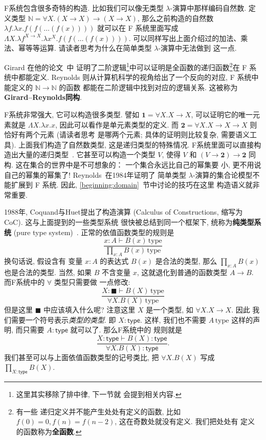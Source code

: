 \documentclass[UTF8]{ctexbook}
\newcommand{\cons}[1]{\textsf{#1}}
\theoremstyle{plain}
\theoremstyle{definition}
\theoremstyle{remark}
\begin{document}
F系统包含很多奇特的构造. 比如我们可以像无类型
\(\lambda\)-演算中那样编码自然数. 定义类型
\(\mathbb N = \forall X. (X \to X) \to (X \to X)\),
那么之前构造的自然数 \(\lambda f. \lambda x. f(f(\dots(f(x))))\)
就可以在 F 系统里面写成
\(\Lambda X. \lambda f^{X\to X}. \lambda x^X. f(f(\dots(f(x))))\).
可以同样写出上面介绍过的加法、乘法、幂等等运算.
请读者思考为什么在简单类型 \(\lambda\)-演算中无法做到
这一点.

Girard 在他的论文~\cite{girard:1972:systemf}中
证明了二阶逻辑\footnote{这里其实移除了排中律, 下一节就
会提到相关内容.}中可以证明是全函数的递归函数\footnote{有一些
递归定义并不能产生处处有定义的函数, 比如 \(f(0) = 0,
f(n) = f(n-2)\), 这在奇数处就没有定义. 我们把处处有
定义的函数称为\textbf{全函数}.}在 F 系统中都能定义.
Reynolds 则从计算机科学的视角给出了一个反向的对应,
F 系统中能定义的 \(\mathbb N \to \mathbb N\) 的函数
都能在二阶逻辑中找到对应的逻辑关系. 这被称为
\textbf{Girard--Reynolds同构}.

F系统非常强大, 它可以构造很多类型. 譬如 \(\mathbf 1 =
\forall X. X \to X\), 可以证明它的唯一元素就是 \(\Lambda X. \lambda x. x\),
因此可以看作是单元素类型的定义. 而 \(\mathbf 2 =
\forall X. X \to X \to X\) 则恰好有两个元素 (请读者思考
是哪两个元素; 具体的证明则比较复杂, 需要语义工具).
上面我们构造了自然数类型, 这是递归类型的特殊情况.
F系统里面可以直接构造出大量的递归类型~\cite{wadler:1990:free}.
它甚至可以构造一个类型 \(V\),
使得 \(V\) 和 \((V \to \mathbf 2) \to \mathbf 2\) 同构.
这在集合的世界中是不可想象的： 一个集合永远比自己的幂集要
小, 更不用说自己的幂集的幂集了!
Reynolds~\cite{reynolds:1984:polymorphism}在1984年证明了
简单类型 \(\lambda\)-演算的集合论模型不能扩展到 F 系统.
因此, \ref{beginning:domain}~节中讨论的技巧在这里
构造语义就非常重要.

1988年, Coquand与Huet提出了构造演算 (Calculus of
Constructions, 缩写为 CoC). 这与上面提到的一些类型系统
很快被总结到同一个框架下, 统称为\textbf{纯类型系统}
(pure type system)~\cite{barendregt:1992:lambda}.
正常的依值函数类型的规则是
\[\frac{x{:}A \vdash B(x)\,\text{type}}{\prod_{x:A}B(x)\,\text{type}}\]
换句话说, 假设含有
变量 \(x : A\) 的表达式 \(B(x)\) 是合法的类型,
那么 \(\prod_{x:A}B(x)\) 也是合法的类型. 当然,
如果 \(B\) 不含变量 \(x\), 这就退化到普通的函数类型
\(A \to B\). 而F系统中的 \(\forall\) 类型只需要做
一点修改:
\[\frac{X{:} \blacksquare \vdash B(X)\,\text{type}}{\forall X. B(X)\,\text{type}}\]
但是这里 \(\blacksquare\) 中应该填入什么呢? 注意这里
\(X\) 是一个类型, 如 \(\forall X. X \to X\). 因此
我们需要一个符号表示\emph{类型的类型}. 即 \(X : \cons{type}\).
这样, 我们也不需要 \(A\,\text{type}\) 这样的声明,
而只需要 \(A : \cons{type}\) 就可以了. 那么F系统中的
规则就是
\[\frac{X{:}\cons{type} \vdash B(X):\cons{type}}{\forall X. B(X) : \cons{type}}.\]
我们甚至可以与上面依值函数类型的记号类比, 把 \(\forall X. B(X)\)
写成 \(\prod_{X : \cons{type}} B(X)\).
\end{document}
